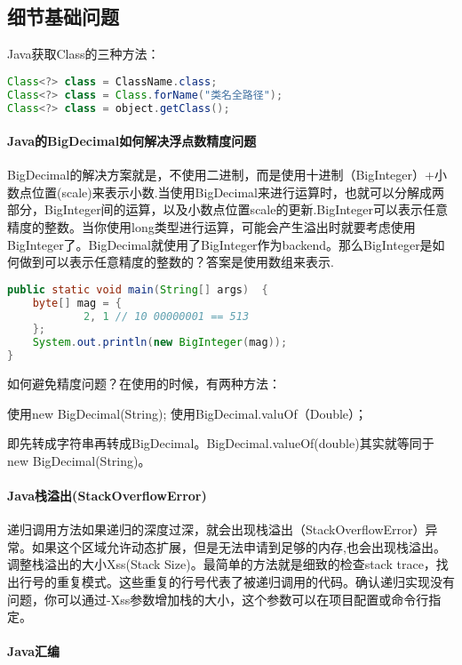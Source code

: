 \documentclass[../../../interview-questions.tex]{subfiles}
\begin{document}
\subsection{细节基础问题}

Java获取Class的三种方法：

\begin{lstlisting}[language=Java]
Class<?> class = ClassName.class;
Class<?> class = Class.forName("类名全路径");
Class<?> class = object.getClass();
\end{lstlisting}


\paragraph{Java的BigDecimal如何解决浮点数精度问题}

BigDecimal的解决方案就是，不使用二进制，而是使用十进制（BigInteger）+小数点位置(scale)来表示小数.当使用BigDecimal来进行运算时，也就可以分解成两部分，BigInteger间的运算，以及小数点位置scale的更新.BigInteger可以表示任意精度的整数。当你使用long类型进行运算，可能会产生溢出时就要考虑使用BigInteger了。BigDecimal就使用了BigInteger作为backend。那么BigInteger是如何做到可以表示任意精度的整数的？答案是使用数组来表示.

\begin{lstlisting}[language=Java]
public static void main(String[] args)  {
    byte[] mag = {
            2, 1 // 10 00000001 == 513
    };
    System.out.println(new BigInteger(mag));
}
\end{lstlisting}

如何避免精度问题？在使用的时候，有两种方法：

使用new BigDecimal(String);
使用BigDecimal.valuOf（Double）；

即先转成字符串再转成BigDecimal。BigDecimal.valueOf(double)其实就等同于new BigDecimal(String)。

\paragraph{Java栈溢出(StackOverflowError)}

递归调用方法如果递归的深度过深，就会出现栈溢出（StackOverflowError）异常。如果这个区域允许动态扩展，但是无法申请到足够的内存,也会出现栈溢出。调整栈溢出的大小Xss(Stack Size)。最简单的方法就是细致的检查stack trace，找出行号的重复模式。这些重复的行号代表了被递归调用的代码。确认递归实现没有问题，你可以通过-Xss参数增加栈的大小，这个参数可以在项目配置或命令行指定。

\paragraph{Java汇编}
\end{document}
